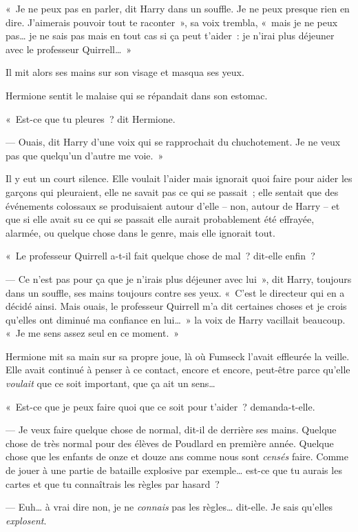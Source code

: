 «~Je ne peux pas en parler, dit Harry dans un souffle. Je ne peux presque rien en dire. J'aimerais pouvoir tout te raconter~», sa voix trembla, «~mais je ne peux pas… je ne sais pas mais en tout cas si ça peut t'aider~: je n'irai plus déjeuner avec le professeur Quirrell…~»

Il mit alors ses mains sur son visage et masqua ses yeux.

Hermione sentit le malaise qui se répandait dans son estomac.

«~Est-ce que tu pleures~? dit Hermione.

--- Ouais, dit Harry d'une voix qui se rapprochait du chuchotement. Je ne veux pas que quelqu'un d'autre me voie.~»

Il y eut un court silence. Elle voulait l'aider mais ignorait quoi faire pour aider les garçons qui pleuraient, elle ne savait pas ce qui se passait~; elle sentait que des événements colossaux se produisaient autour d'elle -- non, autour de Harry -- et que si elle avait su ce qui se passait elle aurait probablement été effrayée, alarmée, ou quelque chose dans le genre, mais elle ignorait tout.

«~Le professeur Quirrell a-t-il fait quelque chose de mal~? dit-elle enfin~?

--- Ce n'est pas pour ça que je n'irais plus déjeuner avec lui~», dit Harry, toujours dans un souffle, ses mains toujours contre ses yeux. «~C'est le directeur qui en a décidé ainsi. Mais ouais, le professeur Quirrell m'a dit certaines choses et je crois qu'elles ont diminué ma confiance en lui…~» la voix de Harry vacillait beaucoup. «~Je me sens assez seul en ce moment.~»

Hermione mit sa main sur sa propre joue, là où Fumseck l'avait effleurée la veille. Elle avait continué à penser à ce contact, encore et encore, peut-être parce qu'elle \emph{voulait} que ce soit important, que ça ait un sens…

«~Est-ce que je peux faire quoi que ce soit pour t'aider~? demanda-t-elle.

--- Je veux faire quelque chose de normal, dit-il de derrière ses mains. Quelque chose de très normal pour des élèves de Poudlard en première année. Quelque chose que les enfants de onze et douze ans comme nous sont \emph{censés} faire. Comme de jouer à une partie de bataille explosive par exemple… est-ce que tu aurais les cartes et que tu connaîtrais les règles par hasard~?

--- Euh… à vrai dire non, je ne \emph{connais} pas les règles… dit-elle. Je sais qu'elles \emph{explosent}.

